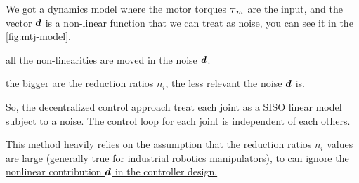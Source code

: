 We got a dynamics model where the motor torques $\boldsymbol{\tau}_m$ are the input, and the vector $\boldsymbol{d}$ is a non-linear function that we can treat as noise, you can see it in the \autoref{fig:mtj-model}.

\begin{nb}all the non-linearities are moved in the noise $\boldsymbol{d}$.\end{nb}
\begin{nb}the bigger are the reduction ratios $n_i$, the less relevant the noise $\boldsymbol{d}$ is.\end{nb}

So, the decentralized control approach treat each joint as a SISO linear model subject to a noise.
The control loop for each joint is independent of each others.

\ul{This method heavily relies on the assumption that the reduction ratios $n_i$ values are large} (generally true for industrial robotics manipulators), \ul{to can ignore the nonlinear contribution $\boldsymbol{d}$ in the controller design.}


